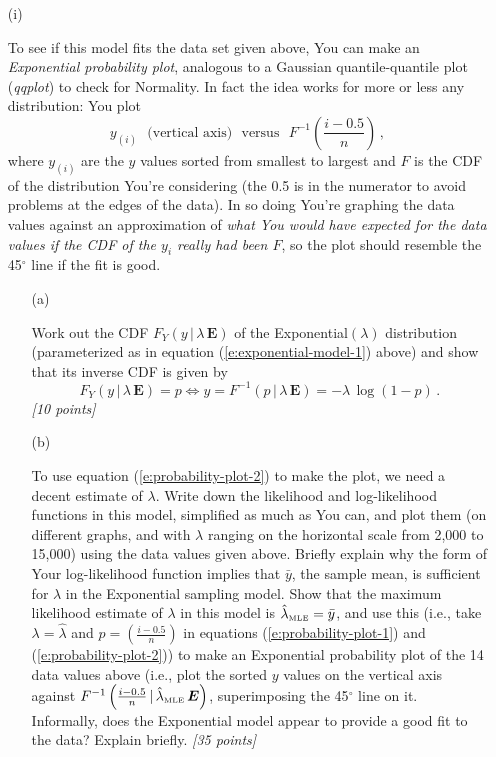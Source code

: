 \documentclass[12pt]{article}
\newcommand{\given}{\, | \,}
\newcommand{\given}{\, | \,}
\begin{document}
\begin{itemize}
\begin{itemize}

\item[(i)]

To see if this model fits the data set given above, You can make an \textit{Exponential probability plot}, analogous to a Gaussian quantile-quantile plot (\textit{qqplot}) to check for Normality. In fact the idea works for more or less any distribution: You plot 
\begin{equation} \label{e:probability-plot-1}
y_{ ( i ) } \ \ \ \mbox{(vertical axis)} \ \ \ \mbox{versus} \ \ \ F^{ -1 } \left( \frac{ i - 0.5 }{ n }
\right) \, ,
\end{equation}
where $y_{ ( i ) }$ are the $y$ values sorted from smallest to largest and $F$ is the CDF of the distribution You're considering (the 0.5 is in the numerator to avoid problems at the edges of the data). In so doing You're graphing the data values against an approximation of \textit{what You would have expected for the data values if the CDF of the $y_i$ really had been $F$}, so the plot should resemble the 45$^\circ$ line if the fit is good.  

\begin{itemize}

\item[(a)] 

Work out the CDF $F_Y ( y \given \lambda \, \bm{ E } )$ of the Exponential$( \lambda )$ distribution (parameterized as in equation (\ref{e:exponential-model-1}) above)
and show that its inverse CDF is given by
\begin{equation} \label{e:probability-plot-2}
F_Y ( y \given \lambda \, \bm{ E } ) = p \iff y = F^{ -1 }( p \given \lambda \, \bm{ E } ) = - \lambda \, \log ( 1 - p ) \, .
\end{equation}
\textit{[10 points]} 

\item[(b)] 

To use equation (\ref{e:probability-plot-2}) to make the plot, we need a decent estimate of $\lambda$. Write down the likelihood and log-likelihood functions in this model, simplified as much as You can, and plot them (on different graphs, and with $\lambda$ ranging on the horizontal scale from 2,000 to 15,000) using the data values given above. Briefly explain why the form of Your log-likelihood function implies that $\bar{ y }$, the sample mean, is sufficient for $\lambda$ in the Exponential sampling model. Show that the maximum likelihood estimate of $\lambda$ in this model is $\hat{ \lambda }_{\mbox{\tiny MLE}} = \bar{ y }$, and use this (i.e., take $\lambda = \hat{ \lambda }$ and $p = \left( \frac{ i - 0.5 }{ n } \right)$ in equations (\ref{e:probability-plot-1}) and (\ref{e:probability-plot-2})) to make an Exponential probability plot of the 14 data values above (i.e., plot the sorted $y$ values on the vertical axis against $F^{ -1 } \left( \frac{ i - 0.5 }{ n } \given \hat{ \lambda }_{\mbox{\tiny MLE}} \, \bm{ E } \right)$, superimposing the 45$^\circ$ line on it. Informally, does the Exponential model appear to provide a good fit to the data? Explain briefly. \textit{[35 points]} 


\end{itemize}
\end{itemize}
\end{itemize}
\end{document}
